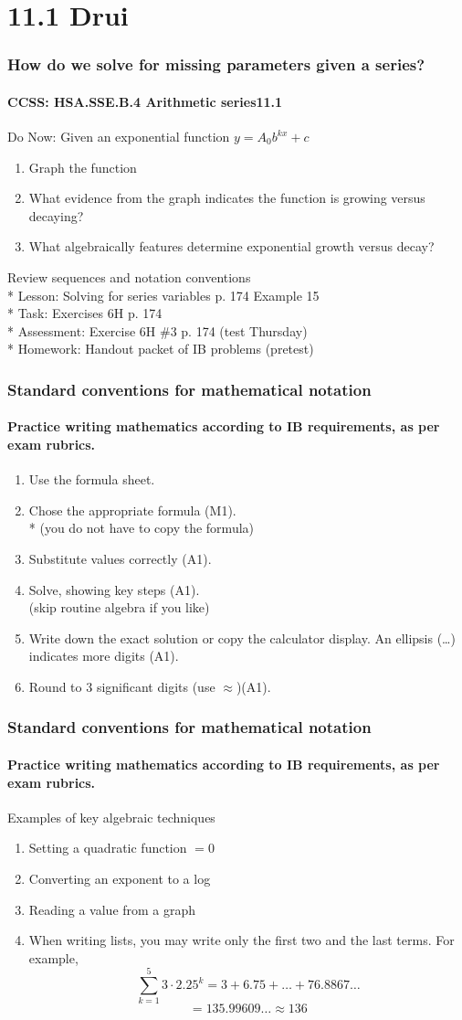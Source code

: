 \documentclass{beamer}
\begin{document}
\section{11.1 Drui}
\frame
{
  \frametitle{How do we solve for missing parameters given a series?}
  \framesubtitle{CCSS: HSA.SSE.B.4 Arithmetic series\qquad \alert{11.1}}

  \begin{block}{Do Now: Given an exponential function $y=A_0b^{kx}+c$}
  \begin{enumerate}
      \item Graph the function
      \item What evidence from the graph indicates the function is growing versus decaying?
      \item What algebraically features determine exponential growth versus decay?
  \end{enumerate}
  \end{block}
  Review sequences and notation conventions\\*
  Lesson: Solving for series variables p. 174 Example 15 \\*
  Task: Exercises 6H p. 174\\*
  Assessment: Exercise 6H \#3 p. 174 \alert{(test Thursday)}\\*
  Homework: Handout packet of IB problems (pretest)
}

\frame
{
  \frametitle{Standard conventions for mathematical notation}
  \framesubtitle{Practice writing mathematics according to IB requirements, as per exam rubrics.}
\begin{enumerate}
    \item Use the formula sheet.
    \item Chose the appropriate formula (M1).\\*
    (you do not have to copy the formula)
    \item Substitute values correctly (A1). 
    \item Solve, showing key steps (A1).\\
    (skip routine algebra if you like)
    \item Write down the exact solution or copy the calculator display. An ellipsis (\ldots) indicates more digits (A1).
    \item Round to 3 significant digits (use $\approx$)(A1).
\end{enumerate}
}

\frame
{
  \frametitle{Standard conventions for mathematical notation}
  \framesubtitle{Practice writing mathematics according to IB requirements, as per exam rubrics.}
Examples of key algebraic techniques
\begin{enumerate}
    \item Setting a quadratic function $=0$
    \item Converting an exponent to a log
    \item Reading a value from a graph
    \item When writing lists, you may write only the first two and the last terms. For example,
\[\sum_{k=1}^5 3 \cdot 2.25^k =3 + 6.75+\ldots+76.8867\ldots\]
\[=135.99609\ldots \approx 136\]
\end{enumerate}
}
\end{document}

